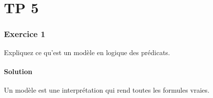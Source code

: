 \chapter*{TP 5}








\subsection*{Exercice 1}
Expliquez ce qu'est un modèle en logique des prédicats. 

    \subsubsection*{Solution}
    
    Un modèle est une interprétation qui rend toutes les formules vraies.
    

